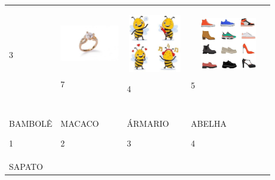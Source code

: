 \begin{escola}
\begin{longtable}[]{@{}llll@{}}
\begin{minipage}[t]{0.24\columnwidth}
3\strut
\end{minipage} & \begin{minipage}[t]{0.24\columnwidth}\raggedright\strut
\includegraphics[width=1.00972in,height=0.84375in]{media/image119.jpg}

7\strut
\end{minipage} & \begin{minipage}[t]{0.24\columnwidth}\raggedright\strut
\includegraphics[width=0.96875in,height=0.99167in]{media/image120.jpg}

4\strut
\end{minipage} & \begin{minipage}[t]{0.24\columnwidth}\raggedright\strut
\includegraphics[width=1.30694in,height=0.88542in]{media/image121.jpg}

5\strut
\end{minipage}\tabularnewline
& & &\tabularnewline
\begin{minipage}[t]{0.24\columnwidth}\raggedright\strut
BAMBOLÊ

1\strut
\end{minipage} & \begin{minipage}[t]{0.24\columnwidth}\raggedright\strut
MACACO

2\strut
\end{minipage} & \begin{minipage}[t]{0.24\columnwidth}\raggedright\strut
ÁRMARIO

3\strut
\end{minipage} & \begin{minipage}[t]{0.24\columnwidth}\raggedright\strut
ABELHA

4\strut
\end{minipage}\tabularnewline
\begin{minipage}[t]{0.24\columnwidth}\raggedright\strut
SAPATO


\end{minipage}
\end{longtable}
\end{escola}
